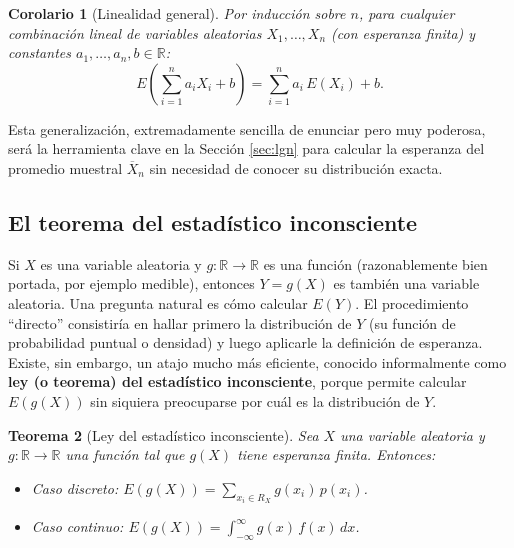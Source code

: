 \documentclass[11pt,a4paper]{article}
\theoremstyle{plain}
\newtheorem{teorema}{Teorema}[section]
\newtheorem{corolario}[teorema]{Corolario}
\theoremstyle{definition}
\theoremstyle{remark}
\begin{document}
\begin{corolario}[Linealidad general]
Por inducción sobre $n$, para cualquier combinación lineal de variables aleatorias $X_1,\dots,X_n$ (con esperanza finita) y constantes $a_1,\dots,a_n,b\in\mathbb{R}$:
\[
E\left(\sum_{i=1}^n a_i X_i + b\right) = \sum_{i=1}^n a_i\,E(X_i) + b.
\]
\end{corolario}

Esta generalización, extremadamente sencilla de enunciar pero muy poderosa, será la herramienta clave en la Sección \ref{sec:lgn} para calcular la esperanza del promedio muestral $\overline{X}_n$ sin necesidad de conocer su distribución exacta.

\subsection{El teorema del estadístico inconsciente}

Si $X$ es una variable aleatoria y $g:\mathbb{R}\to\mathbb{R}$ es una función (razonablemente bien portada, por ejemplo medible), entonces $Y=g(X)$ es también una variable aleatoria. Una pregunta natural es cómo calcular $E(Y)$. El procedimiento ``directo'' consistiría en hallar primero la distribución de $Y$ (su función de probabilidad puntual o densidad) y luego aplicarle la definición de esperanza. Existe, sin embargo, un atajo mucho más eficiente, conocido informalmente como \textbf{ley (o teorema) del estadístico inconsciente}, porque permite calcular $E(g(X))$ sin siquiera preocuparse por cuál es la distribución de $Y$.

\begin{teorema}[Ley del estadístico inconsciente]
Sea $X$ una variable aleatoria y $g:\mathbb{R}\to\mathbb{R}$ una función tal que $g(X)$ tiene esperanza finita. Entonces:
\begin{itemize}
\item Caso discreto: $\displaystyle E(g(X)) = \sum_{x_i\in R_X} g(x_i)\,p(x_i)$.
\item Caso continuo: $\displaystyle E(g(X)) = \int_{-\infty}^{\infty} g(x)\,f(x)\,dx$.
\end{itemize}
\end{teorema}
\end{document}
